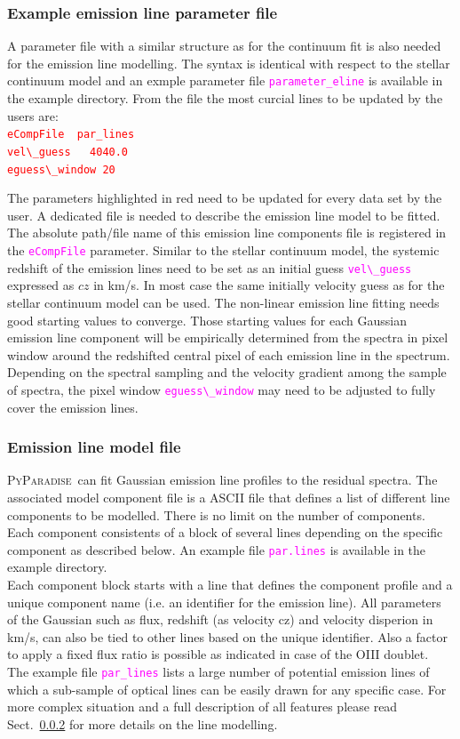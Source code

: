 \documentclass[usenatbib,usegraphicx,useAMS,onecolumn]{mn2e}
\newcommand{\codeline}[1]{\lstinline|#1|}
\newcommand{\fname}[1]{\textcolor{magenta}{\codeline{#1}}}
\newcommand{\PyPar}{\mbox{\textsc{PyParadise}}}
\begin{document}
\subsubsection{Example emission line parameter file}
A parameter file with a similar structure as for the continuum fit is also needed for the emission line modelling. The syntax is identical with respect to the stellar continuum model and an exmple parameter file \fname{parameter_eline} is available in the example directory. From the file the most curcial lines to be updated by the users are:\bigskip\\
\textcolor{red}{\codeline{eCompFile  par_lines}}\\
\textcolor{red}{\codeline{vel\_guess   4040.0}}\\
\textcolor{red}{\codeline{eguess\_window 20}}

The parameters highlighted in red need to be updated for every data set by the user. A dedicated file is needed to describe the emission line model to be fitted. The absolute path/file name of this emission line components file is registered in the \fname{eCompFile} parameter. Similar to the stellar continuum model, the systemic redshift of the emission lines need to be set as an initial guess \fname{vel\_guess} expressed as $cz$ in km/s. In most case the same initially velocity guess as for the stellar continuum model can be used. The non-linear emission line fitting needs good starting values to converge. Those starting values for each Gaussian emission line component will be empirically determined from the spectra in pixel window around the redshifted central pixel of each emission line in the spectrum. Depending on the spectral sampling and the velocity gradient among the sample of spectra, the pixel window \fname{eguess\_window} may need to be adjusted to fully cover the emission lines.

\subsubsection{Emission line model file}
\PyPar\ can fit Gaussian emission line profiles to the residual spectra. The associated model component file is a ASCII file that defines a list of different line components to be modelled. There is no limit on the number of components. Each component consistents of a block of several lines depending on the specific component as described below. An example file \fname{par.lines} is available in the example directory.\bigskip\\
Each component block starts with a line that defines the component profile and a unique component name (i.e. an identifier for the emission line). All parameters of the Gaussian such as flux, redshift (as velocity cz) and velocity disperion in km/s, can also be tied to other lines based on the unique identifier. Also a factor to apply a fixed flux ratio is possible as indicated in case of the OIII doublet. \bigskip\\
The example file \fname{par_lines} lists a large number of potential emission lines of which a sub-sample of optical lines can be easily drawn for any specific case. For more complex situation and a full description of all features please read Sect.~\ref{} for more details on the line modelling.
\end{document}
